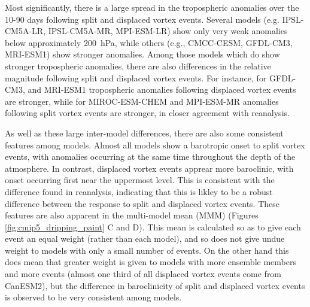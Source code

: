 Most significantly, there is a large spread in the tropospheric anomalies over
the 10-90 days following split and displaced vortex events. Several models
(e.g. IPSL-CM5A-LR, IPSL-CM5A-MR, MPI-ESM-LR) show only very weak anomalies
below approximately 200~hPa, while others (e.g., CMCC-CESM, GFDL-CM3, MRI-ESM1)
show stronger anomalies. Among those models which do show stronger tropospheric
anomalies, there are also differences in the relative magnitude following split
and displaced vortex events. For instance, for GFDL-CM3, and MRI-ESM1
tropospheric anomalies following displaced vortex events are stronger, while for
MIROC-ESM-CHEM and MPI-ESM-MR anomalies following split vortex events are
stronger, in closer agreement with reanalysis. 

As well as these large inter-model differences, there are also some consistent
features among models. Almost all models show a barotropic onset to split vortex
events, with anomalies occurring at the same time throughout the depth of the
atmosphere. In contrast, displaced vortex events apprear more baroclinic, with
onset occurring first near the uppermost level. This is consistent with the
difference found in reanalysis, indicating that this is likley to be a robust
difference between the response to split and displaced vortex events. These
features are also apparent in the multi-model mean (MMM) (Figures
\ref{fig:cmip5_dripping_paint} C and D). This mean is calculated so as to give
each event an equal weight (rather than each model), and so does not give undue
weight to models with only a small number of events. On the other hand this does
mean that greater weight is given to models with more ensemble members and more
events (almost one third of all displaced vortex events come from CanESM2), but
the difference in baroclinicity of split and displaced vortex events is observed
to be very consistent among models.

